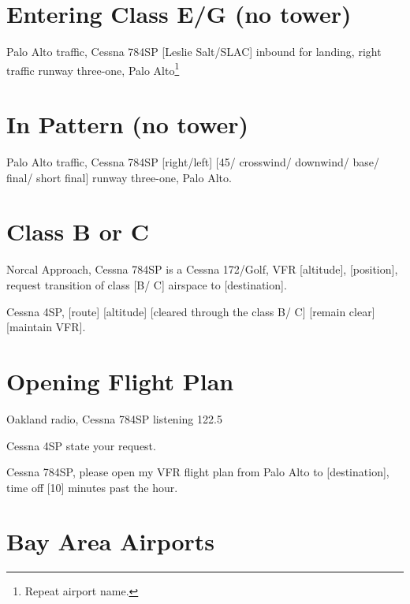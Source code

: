 \documentclass[article,9pt,landscape]{memoir}
\begin{document}
\begin{multicols*}{4}
  \chapter{Entering Class E/G (no tower)}
  Palo Alto traffic, Cessna 784SP [Leslie Salt/SLAC] inbound for
  landing, right traffic runway three-one, Palo Alto\footnote{Repeat
    airport name.}

  \chapter{In Pattern (no tower)}
  Palo Alto traffic, Cessna 784SP [right/left] [45/ crosswind/
    downwind/ base/ final/ short final] runway three-one, Palo Alto.

  \chapter{Class B or C}
  Norcal Approach, Cessna 784SP is a Cessna 172/Golf, VFR [altitude],
  [position], request transition of class [B/ C] airspace to
  [destination].

  \readback 
  Cessna 4SP, [route] [altitude] [cleared through the class
    B/ C] [remain clear] [maintain VFR].

  \chapter{Opening Flight Plan}
  Oakland radio, Cessna 784SP listening 122.5

  \readback
  Cessna 4SP state your request.

  Cessna 784SP, please open my VFR flight plan from Palo
  Alto to [destination], time off [10] minutes past the hour.
  
  \chapter{Bay Area Airports}


  

\end{multicols*}
\end{document}
